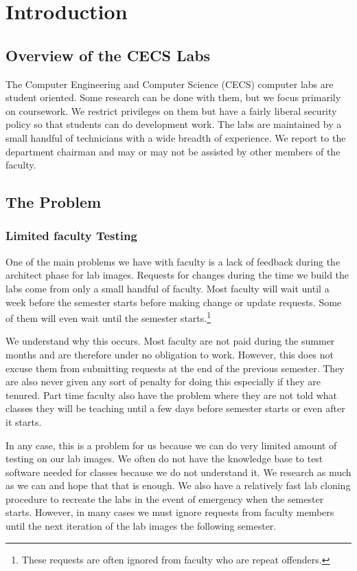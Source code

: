 \chapter{Introduction} \label{ch:introduction}
\section{Overview of the CECS Labs}
The Computer Engineering and Computer Science (CECS) computer labs are student oriented.  Some research can be done with them, but we focus primarily on coursework.  We restrict privileges on them but have a fairly liberal security policy so that students can do development work. The labs are maintained by a small handful of technicians with a wide breadth of experience. We report to the department chairman and may or may not be assisted by other members of the faculty. 

\section{The Problem} \label{sec:the_problem}
\subsection{Limited faculty Testing}
One of the main problems we have with faculty is a lack of feedback during the architect phase for lab images.  Requests for changes during the time we build the labs come from only a small handful of faculty.  Most faculty will wait until a week before the semester starts before making change or update requests.  Some of them will even wait until the semester starts.\footnote{These requests are often ignored from faculty who are repeat offenders.}  

We understand why this occurs.  Most faculty are not paid during the summer months and are therefore under no obligation to work.  However, this does not excuse them from submitting requests at the end of the previous semester.  They are also never given any sort of penalty for doing this especially if they are tenured.  Part time faculty also have the problem where they are not told what classes they will be teaching until a few days before semester starts or even after it starts.  

In any case, this is a problem for us because we can do very limited amount of testing on our lab images.  We often do not have the knowledge base to test software needed for classes because we do not understand it.  We research as much as we can and hope that that is enough.  We also have a relatively fast lab cloning procedure to recreate the labs in the event of emergency when the semester starts.  However, in many cases we must ignore requests from faculty members until the next iteration of the lab images the following semester.

